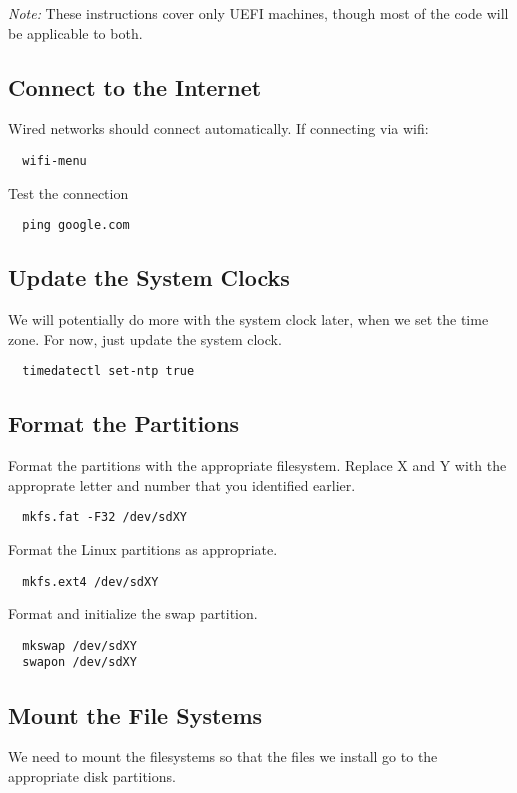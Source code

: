 \documentclass[letterpaper,12pt]{article}
\newcommand{\p}{\par\bigskip}
\begin{document}
{\em Note:} These instructions cover only UEFI machines, though most of the code will be applicable to both. \p


\subsection{Connect to the Internet}
Wired networks should connect automatically. If connecting via wifi:
\begin{lstlisting}
  wifi-menu
\end{lstlisting} \p

Test the connection
\begin{lstlisting}
  ping google.com
\end{lstlisting}


\subsection{Update the System Clocks}
We will potentially do more with the system clock later, when we set the time zone. For now, just update the system clock.
\begin{lstlisting}
  timedatectl set-ntp true
\end{lstlisting}


\subsection{Format the Partitions}
Format the partitions with the appropriate filesystem. Replace X and Y with the approprate letter and number that you identified earlier.
\begin{lstlisting}
  mkfs.fat -F32 /dev/sdXY
\end{lstlisting} \p


Format the Linux partitions as appropriate.
\begin{lstlisting}
  mkfs.ext4 /dev/sdXY
\end{lstlisting} \p


Format and initialize the swap partition.
\begin{lstlisting}
  mkswap /dev/sdXY
  swapon /dev/sdXY
\end{lstlisting}


\subsection{Mount the File Systems}
We need to mount the filesystems so that the files we install go to the appropriate disk partitions. \p
\end{document}
